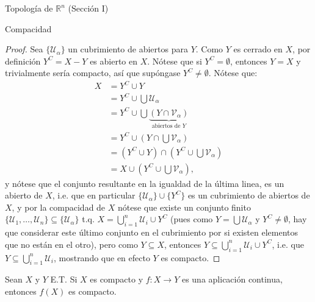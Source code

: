 \begin{chapter}{Topología de $\mathbb{R}^n$ (Sección I)}
\begin{section}{Compacidad}
\begin{proof}
Sea $\{\mathcal{U}_\alpha\}$ un cubrimiento de abiertos para $Y$. Como $Y$ es cerrado en $X$, por definición $Y^C=X-Y$ es abierto en $X$. Nótese que si $Y^C=\emptyset$, entonces $Y=X$ y trivialmente sería compacto, así que supóngase $Y^C\neq\emptyset$. Nótese que:
\begin{equation*} \label{eq1}
\begin{split}
X & = Y^C\cup Y \\
 & = Y^C\cup\bigcup\mathcal{U}_\alpha \\
 & = Y^C\cup\bigcup\underbrace{(Y\cap\mathcal{V}_\alpha)}_{\text{abiertos de $Y$}} \\
 & = Y^C\cup \left(Y\cap\bigcup\mathcal{V}_\alpha\right) \\
 & = (Y^C\cup Y)\cap \left(Y^C\cup\bigcup\mathcal{V}_\alpha\right) \\
 & = X\cup\left(Y^C\cup\bigcup\mathcal{V}_\alpha\right),
\end{split}
\end{equation*}
y nótese que el conjunto resultante en la igualdad de la última linea, es un abierto de $X$, i.e. que en particular $\{\mathcal{U}_\alpha\}\cup\{Y^C\}$ es un cubrimiento de abiertos de $X$, y por la compacidad de $X$ nótese que existe un conjunto finito $\{\mathcal{U}_1,\ldots,\mathcal{U}_n\}\subseteq\{\mathcal{U}_\alpha\}$ t.q. $X=\bigcup_{i=1}^n\mathcal{U}_i\cup Y^C$ (pues como $Y=\bigcup\mathcal{U}_\alpha$ y $Y^C\neq\emptyset$, hay que considerar este último conjunto en el cubrimiento por si existen elementos que no están en el otro), pero como $Y\subseteq X$, entonces $Y\subseteq\bigcup_{i=1}^n\mathcal{U}_i\cup Y^C$, i.e. que $Y\subseteq\bigcup_{i=1}^n\mathcal{U}_i$, mostrando que en efecto $Y$ es compacto.
\end{proof}

\begin{them}
Sean $X$ y $Y$ E.T. Si $X$ es compacto y $f:X\to Y$ es una aplicación continua, entonces $f(X)$ es compacto.
\end{them}


\end{section}
\end{chapter}
